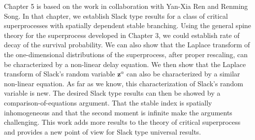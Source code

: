 \documentclass[UTF8]{pkuthss}
\theoremstyle{plain}
\theoremstyle{definition}
\numberwithin{equation}{section}
\begin{document}
    Chapter 5 is based on the work \cite{RenSongSun2018Limit} in collaboration with Yan-Xia Ren and Renming Song. 
    In that chapter, we establish Slack type results for a class of critical superprocesses with spatially dependent stable branching.
    Using the general spine theory for the superprocess developed in Chapter 3, we could establish rate of decay of the survival probability. 
    We can also show that the Laplace transform of the one-dimensional distributions of the superprocess, after proper rescaling, can be characterized by a non-linear delay equation. 
    We then show that the Laplace transform of Slack's random variable $\mathbf z^{\alpha}$ can also be characterized by a similar non-linear equation. 
    As far as we know, this characterization of Slack's random variable is new.
    The desired Slack type results can then be showed by a comparison-of-equations argument.
    That the stable index is spatially inhomogeneous and that the second moment is infinite make the arguments challenging.
    This work adds more results to the theory of critical superprocess and provides a new point of view for Slack type universal results.
	
\end{document}
